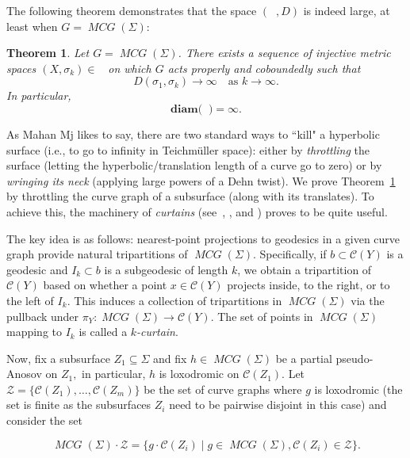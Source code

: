 \documentclass{amsart}
\newtheorem{mainthm}{Theorem}
\numberwithin{thm}{section}
\numberwithin{figure}{section}
\theoremstyle{definition}
\theoremstyle{definition}
\theoremstyle{remark}
\newcommand{\diam }[1]{{\textbf{diam}\big(#1\big)}}
\numberwithin{equation}{section}
\DeclareMathOperator{\MCG}{\mathit{MCG}}
\DeclareMathOperator{\DDGS}{\mathcal{D}_{s}(G)}
\theoremstyle{plain}
\begin{document}
The following theorem demonstrates that the space $(\DDGS, D)$ is indeed large, at least when $G=\MCG(\Sigma)$:

\begin{mainthm}\label{thm:infinitely_many_injective}
Let $G=\MCG(\Sigma)$.
There exists a sequence of
injective metric spaces $(X, \sigma_k) \in \DDGS$ on which $G$ acts properly and coboundedly such that 
\[
D(\sigma_1, \sigma_k) \to \infty \quad \text{as } k \to \infty.
\]
In particular, 
\[
\diam \DDGS = \infty.
\]
\end{mainthm}

As Mahan Mj likes to say, there are two standard ways to ``kill" a hyperbolic surface (i.e., to go to infinity in Teichmüller space): either by \emph{throttling} the surface (letting the hyperbolic/translation length of a curve go to zero) or by \emph{wringing its neck} (applying large powers of a Dehn twist). We prove Theorem~\ref{thm:infinitely_many_injective} by throttling the curve graph of a subsurface (along with its translates). To achieve this, the machinery of \emph{curtains} (see~\cite{PSZCAT}, \cite{zalloum:injectivity}, and \cite{PetytZalloum24}) proves to be quite useful.

The key idea is as follows: nearest-point projections to geodesics in a given curve graph provide natural tripartitions of $\MCG(\Sigma)$. Specifically, if $b \subset \mathcal{C}(Y)$ is a geodesic and $I_k \subset b$ is a subgeodesic of length $k$, we obtain a tripartition of $\mathcal{C}(Y)$ based on whether a point $x \in \mathcal{C}(Y)$ projects inside, to the right, or to the left of $I_k$. This induces a collection of tripartitions in $\MCG(\Sigma)$ via the pullback under $\pi_Y: \MCG(\Sigma) \to \mathcal{C}(Y)$. The set of points in $\MCG(\Sigma)$ mapping to $I_k$ is called a \emph{$k$-curtain}.

Now, fix a subsurface $Z_1 \subseteq \Sigma$ and fix $h \in \MCG(\Sigma)$ be a partial pseudo-Anosov on $Z_1,$ in particular, $h$ is loxodromic on $\mathcal{C}(Z_1).$ Let $\mathcal{Z} = \{\mathcal{C}(Z_1), \dots, \mathcal{C}(Z_m)\}$ be the set of curve graphs where $g$ is loxodromic (the set is finite as the subsurfaces $Z_i$ need to be pairwise disjoint in this case) and consider the set

\[
\MCG(\Sigma) \cdot \mathcal{Z} = \{g \cdot \mathcal{C}(Z_i) \mid g \in \MCG(\Sigma), \mathcal{C}(Z_i) \in \mathcal{Z} \}.
\]
\end{document}
